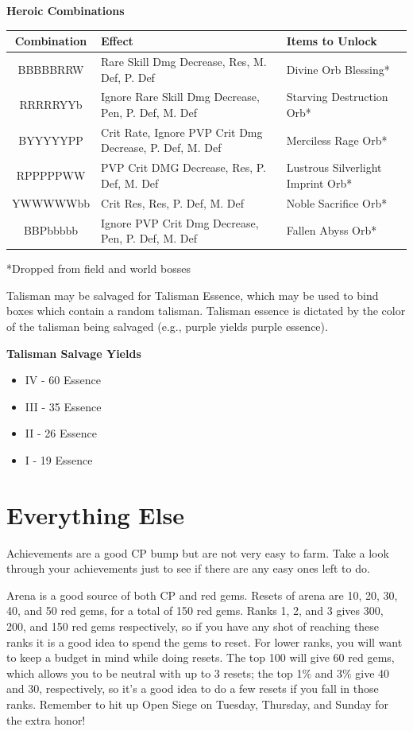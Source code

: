 \documentclass[]{article}
\begin{document}
\begin{center}
\pagebreak
\textbf{Heroic Combinations}

\begin{tabular}{|c|>{\centering}p{8cm}|m{5cm}|}
	\hline 
	Combination & Effect & Items to Unlock \\ 
	\hline 
	BBBBBRRW & Rare Skill Dmg Decrease, Res, M. Def, P. Def & Divine Orb Blessing* \\ 
	\hline 
	RRRRRYYb & Ignore Rare Skill Dmg Decrease, Pen, P. Def, M. Def & Starving Destruction Orb* \\ 
	\hline 
	BYYYYYPP & Crit Rate, Ignore PVP Crit Dmg Decrease, P. Def, M. Def & Merciless Rage Orb* \\ 
	\hline 
	RPPPPPWW & PVP Crit DMG Decrease, Res, P. Def, M. Def & Lustrous Silverlight Imprint Orb* \\ 
	\hline 
	YWWWWWbb & Crit Res, Res, P. Def, M. Def & Noble Sacrifice Orb* \\ 
	\hline 
	BBPbbbbb & Ignore PVP Crit Dmg Decrease, Pen, P. Def, M. Def & Fallen Abyss Orb* \\ 
	\hline 
\end{tabular} 

*Dropped from field and world bosses


\end{center}

Talisman may be salvaged for Talisman Essence, which may be used to bind boxes which contain a random talisman.
Talisman essence is dictated by the color of the talisman being salvaged (e.g., purple yields purple essence).
\begin{center}
	\textbf{Talisman Salvage Yields}
\end{center}
\begin{itemize}
	\item IV - 60 Essence
	\item III - 35 Essence
	\item II - 26 Essence
	\item I - 19 Essence
\end{itemize}

\section{Everything Else}

Achievements are a good CP bump but are not very easy to farm.
Take a look through your achievements just to see if there are any easy ones left to do.

Arena is a good source of both CP and red gems.
Resets of arena are 10, 20, 30, 40, and 50 red gems, for a total of 150 red gems.
Ranks 1, 2, and 3 gives 300, 200, and 150 red gems respectively, so if you have any shot of reaching these ranks it is a good idea to spend the gems to reset.
For lower ranks, you will want to keep a budget in mind while doing resets.
The top 100 will give 60 red gems, which allows you to be neutral with up to 3 resets;
the top 1\% and 3\% give 40 and 30, respectively, so it's a good idea to do a few resets if you fall in those ranks.
Remember to hit up Open Siege on Tuesday, Thursday, and Sunday for the extra honor!
\end{document}
